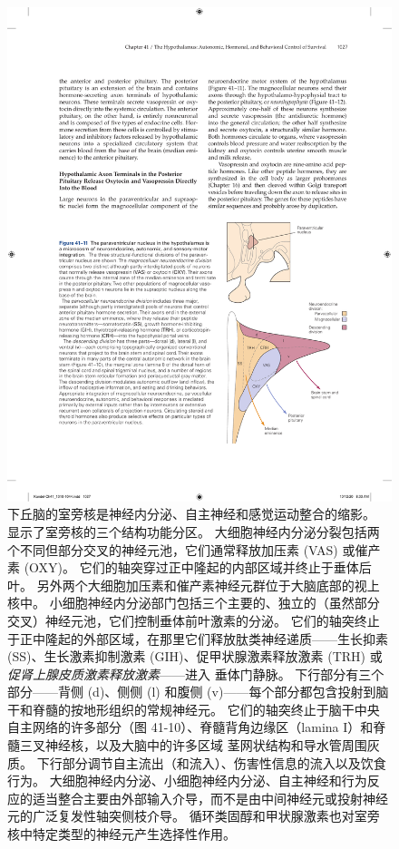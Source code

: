\begin{figure}[htbp]
	\centering
	\includegraphics[width=0.5\linewidth]{chap41/fig_41_11}
	\caption{下丘脑的室旁核是神经内分泌、自主神经和感觉运动整合的缩影。 显示了室旁核的三个结构功能分区。 大细胞神经内分泌分裂包括两个不同但部分交叉的神经元池，它们通常释放加压素 (VAS) 或催产素 (OXY)。 它们的轴突穿过正中隆起的内部区域并终止于垂体后叶。 另外两个大细胞加压素和催产素神经元群位于大脑底部的视上核中。 小细胞神经内分泌部门包括三个主要的、独立的（虽然部分交叉）神经元池，它们控制垂体前叶激素的分泌。 它们的轴突终止于正中隆起的外部区域，在那里它们释放肽类神经递质——生长抑素 (SS)、生长激素抑制激素 (GIH)、促甲状腺激素释放激素 (TRH) 或\textit{促肾上腺皮质激素释放激素}——进入 垂体门静脉。 下行部分有三个部分——背侧 (d)、侧侧 (l) 和腹侧 (v)——每个部分都包含投射到脑干和脊髓的按地形组织的常规神经元。 它们的轴突终止于脑干中央自主网络的许多部分（图 41-10）、脊髓背角边缘区（lamina I）和脊髓三叉神经核，以及大脑中的许多区域 茎网状结构和导水管周围灰质。 下行部分调节自主流出（和流入）、伤害性信息的流入以及饮食行为。 大细胞神经内分泌、小细胞神经内分泌、自主神经和行为反应的适当整合主要由外部输入介导，而不是由中间神经元或投射神经元的广泛复发性轴突侧枝介导。 循环类固醇和甲状腺激素也对室旁核中特定类型的神经元产生选择性作用。}
	\label{fig:41_11}
\end{figure}


